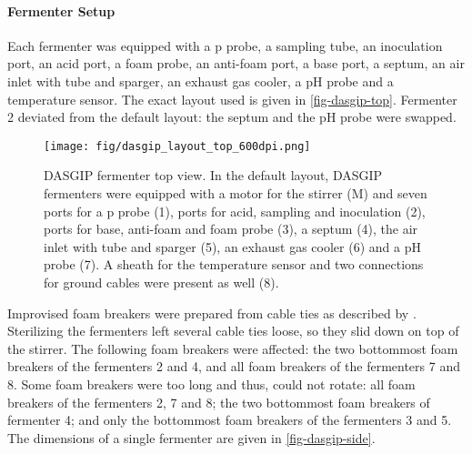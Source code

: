 \paragraph{Fermenter Setup\label{par-met-mibi-ferm-fungi-ferm-setup}}
Each fermenter was equipped with a p probe, a sampling tube, an inoculation port, an acid port, a foam probe, an anti-foam port, a base port, a septum, an air inlet with tube and sparger, an exhaust gas cooler, a pH probe and a temperature sensor. The exact layout used is given in \vref{fig-dasgip-top}. Fermenter 2 deviated from the default layout: the septum and the pH probe were swapped.

\begin{figure}
	\begin{center}
		\texttt{[image: fig/dasgip\_layout\_top\_600dpi.png]}
		\caption[DASGIP Fermenter Top View]{DASGIP fermenter top view. In the default layout, DASGIP fermenters were equipped with a motor for the stirrer (M) and seven ports for a p probe (1), ports for acid, sampling and inoculation (2), ports for base, anti-foam and foam probe (3), a septum (4), the air inlet with tube and sparger (5), an exhaust gas cooler (6) and a pH probe (7). A sheath for the temperature sensor and two connections for ground cables were present as well (\num{8}).\label{fig-dasgip-top}}
	\end{center}
\end{figure}

Improvised foam breakers were prepared from cable ties as described by \textcite{Riedel2011}. Sterilizing the fermenters left several cable ties loose, so they slid down on top of the stirrer. The following foam breakers were affected: the two bottommost foam breakers of the fermenters 2 and 4, and all foam breakers of the fermenters 7 and 8. Some foam breakers were too long and thus, could not rotate: all foam breakers of the fermenters 2, 7 and 8; the two bottommost foam breakers of fermenter 4; and only the bottommost foam breakers of the fermenters 3 and 5. The dimensions of a single fermenter are given in \vref{fig-dasgip-side}.

